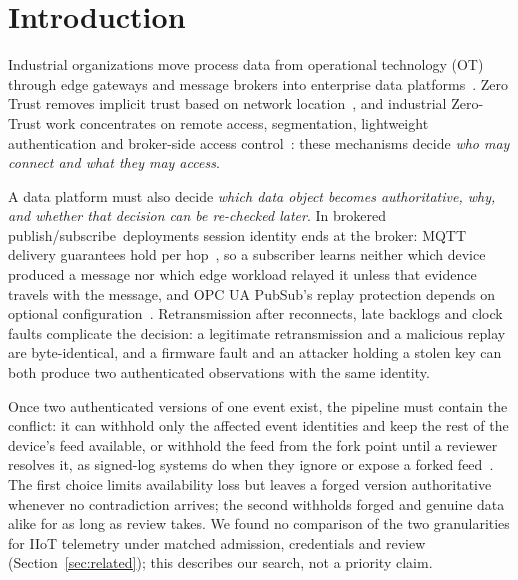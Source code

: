 \documentclass[futureinternet,article,submit,moreauthors]{Definitions/mdpi}
\newcommand{\pubsub}{publish/\allowbreak{}subscribe}
\begin{document}
\section{Introduction}\label{sec:intro}

Industrial organizations move process data from operational technology (OT) through edge gateways and message brokers into enterprise data platforms~\cite{iic_iira_v110}. Zero Trust removes implicit trust based on network location~\cite{nist_sp800_207}, and industrial Zero-Trust work concentrates on remote access, segmentation, lightweight authentication and broker-side access control~\cite{federici2023zt,zanasi2024flexzt,zhang2026lztaka,james2025mqttzt}: these mechanisms decide \emph{who may connect and what they may access}.

A data platform must also decide \emph{which data object becomes authoritative, why, and whether that decision can be re-checked later}. In brokered \pubsub\ deployments session identity ends at the broker: MQTT delivery guarantees hold per hop~\cite{oasis_mqtt5}, so a subscriber learns neither which device produced a message nor which edge workload relayed it unless that evidence travels with the message, and OPC UA PubSub's replay protection depends on optional configuration~\cite{opcua_part2}. Retransmission after reconnects, late backlogs and clock faults complicate the decision: a legitimate retransmission and a malicious replay are byte-identical, and a firmware fault and an attacker holding a stolen key can both produce two authenticated observations with the same identity.

Once two authenticated versions of one event exist, the pipeline must contain the conflict: it can withhold only the affected event identities and keep the rest of the device's feed available, or withhold the feed from the fork point until a reviewer resolves it, as signed-log systems do when they ignore or expose a forked feed~\cite{tarr2019ssb,haeberlen2007peerreview}. The first choice limits availability loss but leaves a forged version authoritative whenever no contradiction arrives; the second withholds forged and genuine data alike for as long as review takes. We found no comparison of the two granularities for IIoT telemetry under matched admission, credentials and review (Section~\ref{sec:related}); this describes our search, not a priority claim.
\end{document}
